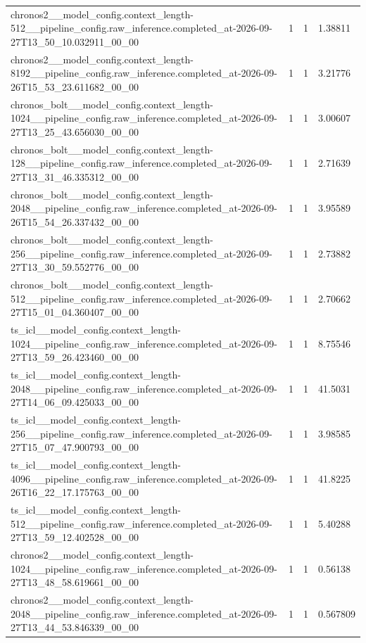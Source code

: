 \begin{tabular}{llll}
chronos2\_\_model\_config.context\_length-512\_\_pipeline\_config.raw\_inference.completed\_at-2026-09-27T13\_50\_10.032911\_00\_00 & 1 & 1 & 1.38811 \\
chronos2\_\_model\_config.context\_length-8192\_\_pipeline\_config.raw\_inference.completed\_at-2026-09-26T15\_53\_23.611682\_00\_00 & 1 & 1 & 3.21776 \\
chronos\_bolt\_\_model\_config.context\_length-1024\_\_pipeline\_config.raw\_inference.completed\_at-2026-09-27T13\_25\_43.656030\_00\_00 & 1 & 1 & 3.00607 \\
chronos\_bolt\_\_model\_config.context\_length-128\_\_pipeline\_config.raw\_inference.completed\_at-2026-09-27T13\_31\_46.335312\_00\_00 & 1 & 1 & 2.71639 \\
chronos\_bolt\_\_model\_config.context\_length-2048\_\_pipeline\_config.raw\_inference.completed\_at-2026-09-26T15\_54\_26.337432\_00\_00 & 1 & 1 & 3.95589 \\
chronos\_bolt\_\_model\_config.context\_length-256\_\_pipeline\_config.raw\_inference.completed\_at-2026-09-27T13\_30\_59.552776\_00\_00 & 1 & 1 & 2.73882 \\
chronos\_bolt\_\_model\_config.context\_length-512\_\_pipeline\_config.raw\_inference.completed\_at-2026-09-27T15\_01\_04.360407\_00\_00 & 1 & 1 & 2.70662 \\
ts\_icl\_\_model\_config.context\_length-1024\_\_pipeline\_config.raw\_inference.completed\_at-2026-09-27T13\_59\_26.423460\_00\_00 & 1 & 1 & 8.75546 \\
ts\_icl\_\_model\_config.context\_length-2048\_\_pipeline\_config.raw\_inference.completed\_at-2026-09-27T14\_06\_09.425033\_00\_00 & 1 & 1 & 41.5031 \\
ts\_icl\_\_model\_config.context\_length-256\_\_pipeline\_config.raw\_inference.completed\_at-2026-09-27T15\_07\_47.900793\_00\_00 & 1 & 1 & 3.98585 \\
ts\_icl\_\_model\_config.context\_length-4096\_\_pipeline\_config.raw\_inference.completed\_at-2026-09-26T16\_22\_17.175763\_00\_00 & 1 & 1 & 41.8225 \\
ts\_icl\_\_model\_config.context\_length-512\_\_pipeline\_config.raw\_inference.completed\_at-2026-09-27T13\_59\_12.402528\_00\_00 & 1 & 1 & 5.40288 \\
chronos2\_\_model\_config.context\_length-1024\_\_pipeline\_config.raw\_inference.completed\_at-2026-09-27T13\_48\_58.619661\_00\_00 & 1 & 1 & 0.56138 \\
chronos2\_\_model\_config.context\_length-2048\_\_pipeline\_config.raw\_inference.completed\_at-2026-09-27T13\_44\_53.846339\_00\_00 & 1 & 1 & 0.567809 \\

\end{tabular}
